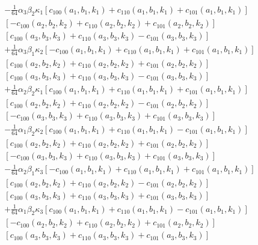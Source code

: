 \documentclass[12pt,onecolumn]{article}
\begin{document}
\begin{equation}
\begin{split}
-\frac{1}{64} \alpha_3 \beta_2 \kappa_1 
   \left[c_{100}(a_1, b_1, k_1) + 
    c_{110}(a_1, b_1, k_1) + 
    c_{101}(a_1, b_1, k_1)\right]\\
   \left[-c_{100}(a_2, b_2, k_2) + 
    c_{110}(a_2, b_2, k_2) + 
    c_{101}(a_2, b_2, k_2)\right]\\
   \left[c_{100}(a_3, b_3, k_3) + 
    c_{110}(a_3, b_3, k_3) - 
    c_{101}(a_3, b_3, k_3)\right] \\ 
+ \frac{1}{64} \alpha_3 \beta_1 \kappa_2 \left[-c_{100}(a_1, b_1, k_1) + c_{110}(a_1, b_1, k_1) + 
    c_{101}(a_1, b_1, k_1)\right]\\ 
   \left[c_{100}(a_2, b_2, k_2) + 
    c_{110}(a_2, b_2, k_2) + 
    c_{101}(a_2, b_2, k_2)\right]\\
   \left[c_{100}(a_3, b_3, k_3) + 
    c_{110}(a_3, b_3, k_3) - 
    c_{101}(a_3, b_3, k_3)\right] \\
+\frac{1}{64} \alpha_2 \beta_2 \kappa_1 \left[c_{100}(a_1, b_1, k_1) + 
    c_{110}(a_1, b_1, k_1) + 
    c_{101}(a_1, b_1, k_1)\right]\\
   \left[c_{100}(a_2, b_2, k_2) + 
    c_{110}(a_2, b_2, k_2) - 
    c_{101}(a_2, b_2, k_2)\right]\\
   \left[-c_{100}(a_3, b_3, k_3) + 
    c_{110}(a_3, b_3, k_3) + 
    c_{101}(a_3, b_3, k_3)\right] \\
- \frac{1}{64} \alpha_1 \beta_2 \kappa_2 \left[c_{100}(a_1, b_1, k_1) + 
    c_{110}(a_1, b_1, k_1) - 
    c_{101}(a_1, b_1, k_1)\right]\\
   \left[c_{100}(a_2, b_2, k_2) + 
    c_{110}(a_2, b_2, k_2) + 
    c_{101}(a_2, b_2, k_2)\right]\\
   \left[-c_{100}(a_3, b_3, k_3) + 
    c_{110}(a_3, b_3, k_3) + 
    c_{101}(a_3, b_3, k_3)\right] \\
- \frac{1}{64} \alpha_2 \beta_1 \kappa_3 \left[-c_{100}(a_1, b_1, k_1) + 
 c_{110}(a_1, b_1, k_1) + 
    c_{101}(a_1, b_1, k_1)\right]\\
   \left[c_{100}(a_2, b_2, k_2) + 
    c_{110}(a_2, b_2, k_2) - 
    c_{101}(a_2, b_2, k_2)\right]\\
   \left[c_{100}(a_3, b_3, k_3) + 
    c_{110}(a_3, b_3, k_3) + 
    c_{101}(a_3, b_3, k_3)\right] \\
+ \frac{1}{64} \alpha_1 \beta_2 \kappa_3 \left[c_{100}(a_1, b_1, k_1) + 
    c_{110}(a_1, b_1, k_1) - 
    c_{101}(a_1, b_1, k_1)\right]\\
   \left[-c_{100}(a_2, b_2, k_2) + 
    c_{110}(a_2, b_2, k_2) + 
    c_{101}(a_2, b_2, k_2)\right]\\
   \left[c_{100}(a_3, b_3, k_3) + 
    c_{110}(a_3, b_3, k_3) + 
    c_{101}(a_3, b_3, k_3)\right]
\end{split}
\end{equation}
\end{document}
